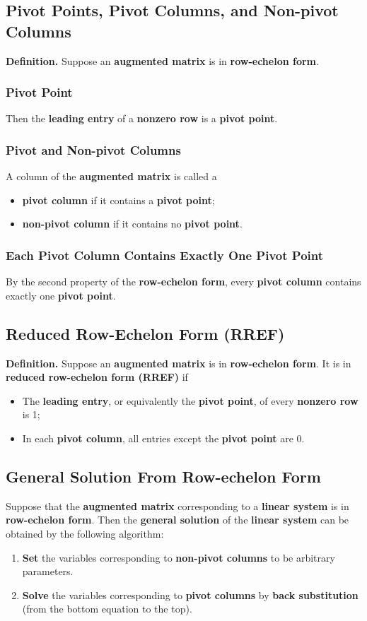 \documentclass[../ma2001_notes.tex]{subfiles}
\begin{document}
\subsection{Pivot Points, Pivot Columns, and Non-pivot Columns}
\textbf{Definition.} Suppose an \textbf{augmented matrix} is in \textbf{row-echelon form}.
\subsubsection{Pivot Point}
Then the \textbf{leading entry} of a \textbf{nonzero row} is a \textbf{pivot point}.

\subsubsection{Pivot and Non-pivot Columns}
A column of the \textbf{augmented matrix} is called a
\begin{itemize}
	\item \textbf{pivot column} if it contains a \textbf{pivot point};
	\item \textbf{non-pivot column} if it contains no \textbf{pivot point}.
\end{itemize}

\subsubsection{Each Pivot Column Contains Exactly One Pivot Point}
By the second property of the \textbf{row-echelon form}, every \textbf{pivot column} contains exactly one \textbf{pivot point}.

\subsection{Reduced Row-Echelon Form (RREF)}
\textbf{Definition.} Suppose an \textbf{augmented matrix} is in \textbf{row-echelon form}. It is in \textbf{reduced row-echelon form (RREF)} if
\begin{itemize}
	\item The \textbf{leading entry}, or equivalently the \textbf{pivot point}, of every \textbf{nonzero row} is 1;
	\item In each \textbf{pivot column}, all entries except the \textbf{pivot point} are 0.
\end{itemize}

\subsection{General Solution From Row-echelon Form}
Suppose that the \textbf{augmented matrix} corresponding to a \textbf{linear system} is in \textbf{row-echelon form}. Then the \textbf{general solution} of the \textbf{linear system} can be obtained by the following algorithm:
\begin{enumerate}
	\item\textbf{Set} the variables corresponding to \textbf{non-pivot columns} to be arbitrary parameters.
	\item\textbf{Solve} the variables corresponding to \textbf{pivot columns} by \textbf{back substitution} (from the bottom equation to the top).
\end{enumerate}
\end{document}
